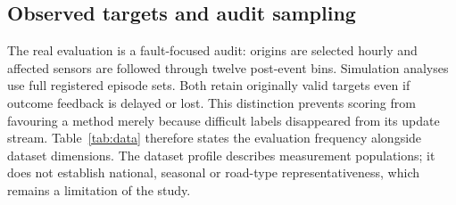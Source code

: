 \subsection{Observed targets and audit sampling}
The real evaluation is a fault-focused audit: origins are selected hourly and affected sensors are followed through twelve post-event bins. Simulation analyses use full registered episode sets. Both retain originally valid targets even if outcome feedback is delayed or lost. This distinction prevents scoring from favouring a method merely because difficult labels disappeared from its update stream. Table~\ref{tab:data} therefore states the evaluation frequency alongside dataset dimensions. The dataset profile describes measurement populations; it does not establish national, seasonal or road-type representativeness, which remains a limitation of the study.
